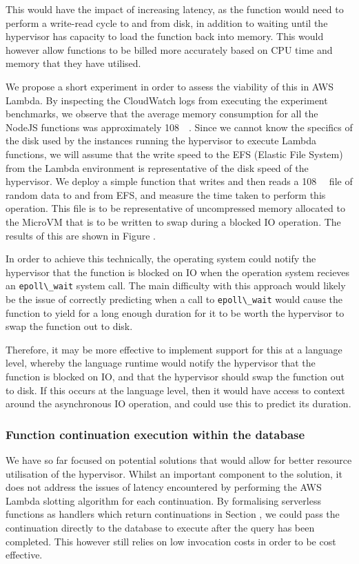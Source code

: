 This would have the impact of increasing latency, as the function would need to perform a write-read cycle to and from disk, in addition to waiting until the hypervisor has capacity to load the function back into memory. This would however allow functions to be billed more accurately based on CPU time and memory that they have utilised.

We propose a short experiment in order to assess the viability of this in AWS Lambda. By inspecting the CloudWatch logs from executing the experiment benchmarks, we observe that the average memory consumption for all the NodeJS functions was approximately \SI{108}{\mega\byte}. Since we cannot know the specifics of the disk used by the instances running the hypervisor to execute Lambda functions, we will assume that the write speed to the EFS (Elastic File System) from the Lambda environment is representative of the disk speed of the hypervisor. We deploy a simple function that writes and then reads a \SI{108}{\mega\byte} file of random data to and from EFS, and measure the time taken to perform this operation. This file is to be representative of uncompressed memory allocated to the MicroVM that is to be written to swap during a blocked IO operation. The results of this are shown in Figure .

In order to achieve this technically, the operating system could notify the hypervisor that the function is blocked on IO when the operation system recieves an \verb|epoll\_wait| system call. The main difficulty with this approach would likely be the issue of correctly predicting when a call to \verb|epoll\_wait| would cause the function to yield for a long enough duration for it to be worth the hypervisor to swap the function out to disk.

Therefore, it may be more effective to implement support for this at a language level, whereby the language runtime would notify the hypervisor that the function is blocked on IO, and that the hypervisor should swap the function out to disk. If this occurs at the language level, then it would have access to context around the asynchronous IO operation, and could use this to predict its duration.

\subsubsection{Function continuation execution within the database}
We have so far focused on potential solutions that would allow for better resource utilisation of the hypervisor. Whilst an important component to the solution, it does not address the issues of latency encountered by performing the AWS Lambda slotting algorithm for each continuation. By formalising serverless functions as handlers which return continuations in Section , we could pass the continuation directly to the database to execute after the query has been completed. This however still relies on low invocation costs in order to be cost effective.


